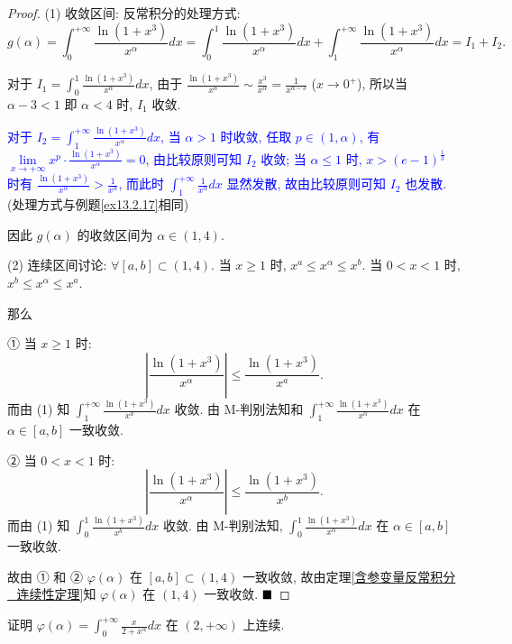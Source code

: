 \documentclass[lang=cn,newtx,10pt,scheme=chinese]{elegantbook}
\begin{document}
\begin{proof}
(1) 收敛区间: 反常积分的处理方式:
$$g(\alpha) = \int_{0}^{+\infty} \frac{\ln(1+x^3)}{x^\alpha} dx = \int_{0}^{1} \frac{\ln(1+x^3)}{x^\alpha} dx + \int_{1}^{+\infty} \frac{\ln(1+x^3)}{x^\alpha} dx = I_1 + I_2.$$

对于 $I_1 = \int_{0}^{1} \frac{\ln(1+x^3)}{x^\alpha} dx$, 由于 $\frac{\ln(1+x^3)}{x^\alpha} \sim \frac{x^3}{x^\alpha} = \frac{1}{x^{\alpha-3}}$ ($x \to 0^+$), 所以当 $\alpha - 3 < 1$ 即 $\alpha < 4$ 时, $I_1$ 收敛.

\textcolor{blue}{对于 $I_2 = \int_{1}^{+\infty} \frac{\ln(1+x^3)}{x^\alpha} dx$, 当 $\alpha > 1$ 时收敛, 任取 $p \in (1, \alpha)$, 有 $\lim\limits_{x \to +\infty} x^p \cdot \frac{\ln(1+x^3)}{x^\alpha} = 0$, 由比较原则可知 $I_2$ 收敛; 当 $\alpha \le 1$ 时, $x > (e-1)^{\frac{1}{3}}$ 时有 $\frac{\ln(1+x^3)}{x^\alpha} > \frac{1}{x^\alpha}$, 而此时 $\int_{1}^{+\infty} \frac{1}{x^\alpha} dx$ 显然发散, 故由比较原则可知 $I_2$ 也发散.}(处理方式与例题\ref{ex13.2.17}相同)

因此 $g(\alpha)$ 的收敛区间为 $\alpha \in (1,4)$.

(2) 连续区间讨论: $\forall [a,b] \subset (1,4)$.
当 $x \ge 1$ 时, $x^a \le x^\alpha \le x^b$. 当 $0<x<1$ 时, $x^b \le x^\alpha \le x^a$.

那么

① 当 $x \ge 1$ 时:
$$|\frac{\ln(1+x^3)}{x^\alpha}| \le \frac{\ln(1+x^3)}{x^a}.$$
而由 (1) 知 $\int_1^{+\infty} \frac{\ln(1+x^3)}{x^a}dx$ 收敛. 由 M-判别法知和 $\int_1^{+\infty} \frac{\ln(1+x^3)}{x^\alpha}dx$ 在 $\alpha \in [a,b]$ 一致收敛.

② 当 $0<x<1$ 时:
$$|\frac{\ln(1+x^3)}{x^\alpha}| \le \frac{\ln(1+x^3)}{x^b}.$$
而由 (1) 知 $\int_0^1 \frac{\ln(1+x^3)}{x^b}dx$ 收敛. 由 M-判别法知, $\int_0^1 \frac{\ln(1+x^3)}{x^\alpha}dx$ 在 $\alpha \in [a,b]$ 一致收敛.

故由 ① 和 ② $\varphi(\alpha)$ 在 $[a,b] \subset (1,4)$ 一致收敛, 故由定理\ref{含参变量反常积分_连续性定理}知 $\varphi(\alpha)$ 在 $(1,4)$ 一致收敛.
$\hfill \blacksquare$
\end{proof}

\begin{example}
证明 $\varphi(\alpha) = \int_{0}^{+\infty} \frac{x}{2+x^\alpha} dx$ 在 $(2, +\infty)$ 上连续.
\end{example}
\end{document}
